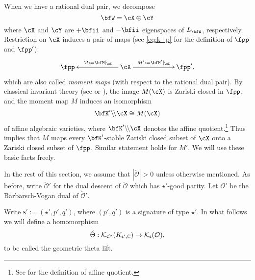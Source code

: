 \documentclass[12pt,a4paper]{amsart}
\def\abs#1{\left|{#1}\right|}
\newcommand{\CK}{{\mathcal {K}}}
\newcommand{\CO}{{\mathcal {O}}}
\numberwithin{equation}{section}
\theoremstyle{remark}
\def\MM{\bfM}
\def\MMP{M}
\def\mstar{{\star}}
\begin{document}
When we have a rational dual pair, we decompose
\[%
\bfW = \cX\oplus \cY
\]%
where $\cX$ and $\cY$ are $+\bfii$ and $-\bfii$ eigenspaces of $L_{\bfW}$,
respectively. Restriction on $\cX$ induces a pair of maps (see \eqref{eq:k+p}
for the definition of $\fpp$ and $\fpp'$):
  \[
    \xymatrix@R=0em@C=6em{
      \fpp &\ar[l]_<>(.5){\MMP:=\MM|_{\cX}} \cX \ar[r]^<>(.5){\MMP':=\MM'|_{\cX}} & \fpp',
    }
  \]
  which are also called \emph{moment maps} (with respect to the rational dual
  pair). By classical invariant theory (see \cite{Weyl} or
  \cite[Lemma~2.1]{NOZ}), the image $M(\cX)$ is Zariski closed in $\fpp$, and
  the moment map $M$ induces an isomorphism
\begin{equation}\label{clinv}
\bfK'\backslash\!\backslash  \cX\cong M(\cX)
\end{equation}
of affine algebraic varieties, where $\bfK'\backslash\!\backslash \cX$ denotes
the affine quotient.\footnote{See \cite[Section~4.4]{PV} for the definition of
  affine quotient.} Thus \cite[Corollary 4.7]{PV} implies that $M$ maps every
$\bfK'$-stable Zariski closed subset of $\cX$ onto a Zariski closed subset of
$\fpp$. Similar statement holds for $M'$. We will use these basic facts freely.



 In the rest of this section, we assume that $\abs{\check \CO}>0$ unless otherwise mentioned.
As before, write $\check \CO'$ for the dual descent of $\check \CO$ which has $\star'$-good parity. Let $\CO'$ be the Barbarsch-Vogan dual of $\check \CO'$.

Write $\mathsf s':=(\star', p',q')$, where $(p',q')$ is a signature of type $\star'$. In what follows we will define a homomorphism
\[
\check{\Theta}:   \CK_{\CO'}(K_{{\mathsf s'},\C})\rightarrow   \CK_{\mathsf s}(\CO),
\]
to be called the geometric theta lift.
\end{document}
